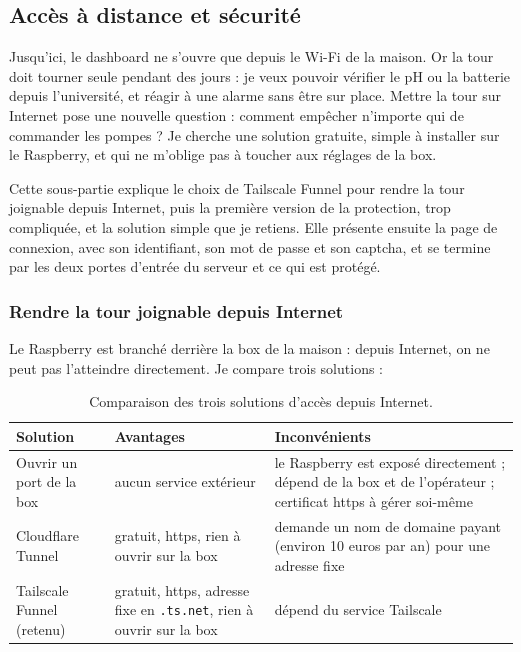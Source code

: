 \subsection{Accès à distance et sécurité}

Jusqu'ici, le dashboard ne s'ouvre que depuis le Wi-Fi de la maison. Or la tour doit tourner seule pendant des jours : je veux pouvoir vérifier le pH ou la batterie depuis l'université, et réagir à une alarme sans être sur place. Mettre la tour sur Internet pose une nouvelle question : comment empêcher n'importe qui de commander les pompes ? Je cherche une solution gratuite, simple à installer sur le Raspberry, et qui ne m'oblige pas à toucher aux réglages de la box.

Cette sous-partie explique le choix de Tailscale Funnel pour rendre la tour joignable depuis Internet, puis la première version de la protection, trop compliquée, et la solution simple que je retiens. Elle présente ensuite la page de connexion, avec son identifiant, son mot de passe et son captcha, et se termine par les deux portes d'entrée du serveur et ce qui est protégé.

\subsubsection*{Rendre la tour joignable depuis Internet}

Le Raspberry est branché derrière la box de la maison : depuis Internet, on ne peut pas l'atteindre directement. Je compare trois solutions :

\begin{table}[H]
\centering
\small
\begin{tabularx}{\textwidth}{|l|Y|Y|}
\hline
\textbf{Solution} & \textbf{Avantages} & \textbf{Inconvénients} \\
\hline
Ouvrir un port de la box & aucun service extérieur & le Raspberry est exposé directement ; dépend de la box et de l'opérateur ; certificat https à gérer soi-même \\
\hline
Cloudflare Tunnel & gratuit, https, rien à ouvrir sur la box & demande un nom de domaine payant (environ 10 euros par an) pour une adresse fixe \\
\hline
Tailscale Funnel (retenu) & gratuit, https, adresse fixe en \texttt{.ts.net}, rien à ouvrir sur la box & dépend du service Tailscale \\
\hline
\end{tabularx}
\caption{Comparaison des trois solutions d'accès depuis Internet.}
\end{table}


